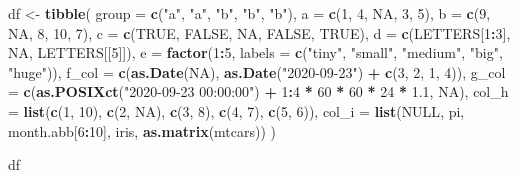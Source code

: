 \documentclass[
]{book}
\newenvironment{Shaded}{\begin{snugshade}}{\end{snugshade}}
\newcommand{\DataTypeTok}[1]{\textcolor[rgb]{0.13,0.29,0.53}{#1}}
\newcommand{\DecValTok}[1]{\textcolor[rgb]{0.00,0.00,0.81}{#1}}
\newcommand{\FloatTok}[1]{\textcolor[rgb]{0.00,0.00,0.81}{#1}}
\newcommand{\KeywordTok}[1]{\textcolor[rgb]{0.13,0.29,0.53}{\textbf{#1}}}
\newcommand{\NormalTok}[1]{#1}
\newcommand{\OperatorTok}[1]{\textcolor[rgb]{0.81,0.36,0.00}{\textbf{#1}}}
\newcommand{\OtherTok}[1]{\textcolor[rgb]{0.56,0.35,0.01}{#1}}
\newcommand{\StringTok}[1]{\textcolor[rgb]{0.31,0.60,0.02}{#1}}
\begin{document}
\begin{Shaded}
\begin{Highlighting}[]
\NormalTok{df <-}\StringTok{ }\KeywordTok{tibble}\NormalTok{(}
  \DataTypeTok{group =} \KeywordTok{c}\NormalTok{(}\StringTok{"a"}\NormalTok{, }\StringTok{"a"}\NormalTok{, }\StringTok{"b"}\NormalTok{, }\StringTok{"b"}\NormalTok{, }\StringTok{"b"}\NormalTok{),}
  \DataTypeTok{a =} \KeywordTok{c}\NormalTok{(}\DecValTok{1}\NormalTok{, }\DecValTok{4}\NormalTok{, }\OtherTok{NA}\NormalTok{, }\DecValTok{3}\NormalTok{, }\DecValTok{5}\NormalTok{),}
  \DataTypeTok{b =} \KeywordTok{c}\NormalTok{(}\DecValTok{9}\NormalTok{, }\OtherTok{NA}\NormalTok{, }\DecValTok{8}\NormalTok{, }\DecValTok{10}\NormalTok{, }\DecValTok{7}\NormalTok{),}
  \DataTypeTok{c =} \KeywordTok{c}\NormalTok{(}\OtherTok{TRUE}\NormalTok{, }\OtherTok{FALSE}\NormalTok{, }\OtherTok{NA}\NormalTok{, }\OtherTok{FALSE}\NormalTok{, }\OtherTok{TRUE}\NormalTok{),}
  \DataTypeTok{d =} \KeywordTok{c}\NormalTok{(LETTERS[}\DecValTok{1}\OperatorTok{:}\DecValTok{3}\NormalTok{], }\OtherTok{NA}\NormalTok{, LETTERS[[}\DecValTok{5}\NormalTok{]]),}
  \DataTypeTok{e =} \KeywordTok{factor}\NormalTok{(}\DecValTok{1}\OperatorTok{:}\DecValTok{5}\NormalTok{, }\DataTypeTok{labels =} \KeywordTok{c}\NormalTok{(}\StringTok{"tiny"}\NormalTok{, }\StringTok{"small"}\NormalTok{, }\StringTok{"medium"}\NormalTok{, }\StringTok{"big"}\NormalTok{, }\StringTok{"huge"}\NormalTok{)),}
  \DataTypeTok{f_col =} \KeywordTok{c}\NormalTok{(}\KeywordTok{as.Date}\NormalTok{(}\OtherTok{NA}\NormalTok{), }\KeywordTok{as.Date}\NormalTok{(}\StringTok{"2020-09-23"}\NormalTok{) }\OperatorTok{+}\StringTok{ }\KeywordTok{c}\NormalTok{(}\DecValTok{3}\NormalTok{, }\DecValTok{2}\NormalTok{, }\DecValTok{1}\NormalTok{, }\DecValTok{4}\NormalTok{)),}
  \DataTypeTok{g_col =} \KeywordTok{c}\NormalTok{(}\KeywordTok{as.POSIXct}\NormalTok{(}\StringTok{"2020-09-23 00:00:00"}\NormalTok{) }\OperatorTok{+}\StringTok{ }\DecValTok{1}\OperatorTok{:}\DecValTok{4} \OperatorTok{*}\StringTok{ }\DecValTok{60} \OperatorTok{*}\StringTok{ }\DecValTok{60} \OperatorTok{*}\StringTok{ }\DecValTok{24} \OperatorTok{*}\StringTok{ }\FloatTok{1.1}\NormalTok{, }\OtherTok{NA}\NormalTok{),}
  \DataTypeTok{col_h =} \KeywordTok{list}\NormalTok{(}\KeywordTok{c}\NormalTok{(}\DecValTok{1}\NormalTok{, }\DecValTok{10}\NormalTok{), }\KeywordTok{c}\NormalTok{(}\DecValTok{2}\NormalTok{, }\OtherTok{NA}\NormalTok{), }\KeywordTok{c}\NormalTok{(}\DecValTok{3}\NormalTok{, }\DecValTok{8}\NormalTok{), }\KeywordTok{c}\NormalTok{(}\DecValTok{4}\NormalTok{, }\DecValTok{7}\NormalTok{), }\KeywordTok{c}\NormalTok{(}\DecValTok{5}\NormalTok{, }\DecValTok{6}\NormalTok{)),}
  \DataTypeTok{col_i =} \KeywordTok{list}\NormalTok{(}\OtherTok{NULL}\NormalTok{, pi, month.abb[}\DecValTok{6}\OperatorTok{:}\DecValTok{10}\NormalTok{], iris, }\KeywordTok{as.matrix}\NormalTok{(mtcars))}
\NormalTok{)}

\NormalTok{df}
\end{Highlighting}
\end{Shaded}
\end{document}
